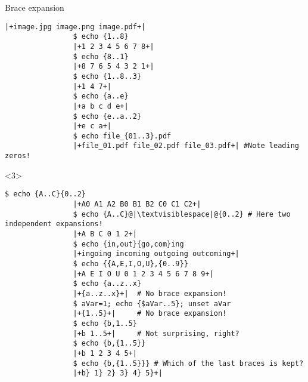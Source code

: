 \begin{frame}[fragile]{Brace expansion}
\begin{overlayarea}{\textwidth}{0.7\textheight}
\begin{onlyenv}
\begin{lstlisting}[style=MyBash, style=oddnumbers, aboveskip=2mm]
                |+image.jpg image.png image.pdf+|
                $ echo {1..8}
                |+1 2 3 4 5 6 7 8+|
                $ echo {8..1}
                |+8 7 6 5 4 3 2 1+|
                $ echo {1..8..3}
                |+1 4 7+|
                $ echo {a..e}
                |+a b c d e+|
                $ echo {e..a..2}
                |+e c a+|
                $ echo file_{01..3}.pdf
                |+file_01.pdf file_02.pdf file_03.pdf+| #Note leading zeros!
            \end{lstlisting}
        \end{onlyenv}
        \begin{onlyenv}<3>
            \begin{lstlisting}[style=MyBash, style=oddnumbers, aboveskip=2mm, firstnumber=18]
                $ echo {A..C}{0..2}
                |+A0 A1 A2 B0 B1 B2 C0 C1 C2+|
                $ echo {A..C}@|\textvisiblespace|@{0..2} # Here two independent expansions!
                |+A B C 0 1 2+|
                $ echo {in,out}{go,com}ing
                |+ingoing incoming outgoing outcoming+|
                $ echo {{A,E,I,O,U},{0..9}}
                |+A E I O U 0 1 2 3 4 5 6 7 8 9+|
                $ echo {a..z..x}
                |+{a..z..x}+|  # No brace expansion!
                $ aVar=1; echo {$aVar..5}; unset aVar
                |+{1..5}+|     # No brace expansion!
                $ echo {b,1..5}
                |+b 1..5+|     # Not surprising, right?
                $ echo {b,{1..5}}
                |+b 1 2 3 4 5+|
                $ echo {b,{1..5}}} # Which of the last braces is kept?
                |+b} 1} 2} 3} 4} 5}+|
            \end{lstlisting}
        \end{onlyenv}
    \end{overlayarea}
\end{frame}
